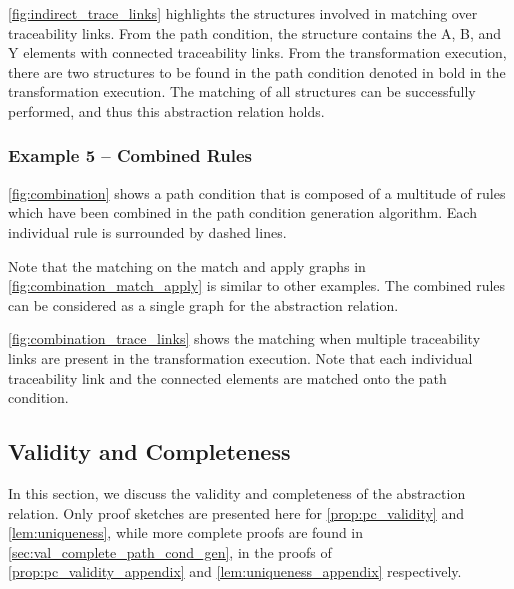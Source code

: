 \cref{fig:indirect_trace_links} highlights the structures involved in matching over traceability links. From the path condition, the structure contains the A, B, and Y elements with connected traceability links. From the transformation execution, there are two structures to be found in the path condition denoted in bold in the transformation execution. The matching of all structures can be successfully performed, and thus this abstraction relation holds.





\subsubsection{Example 5 -- Combined Rules}



\cref{fig:combination} shows a path condition that is composed of a multitude of rules which have been combined in the path condition generation algorithm. Each individual rule is surrounded by dashed lines.

Note that the matching on the match and apply graphs in \cref{fig:combination_match_apply} is similar to other examples. The combined rules can be considered as a single graph for the abstraction relation.

\cref{fig:combination_trace_links} shows the matching when multiple traceability links are present in the transformation execution. Note that each individual traceability link and the connected elements are matched onto the path condition.

\subsection{Validity and Completeness}
\label{subsec:abstraction_relation_validity_completeness}

In this section, we discuss the validity and completeness of the abstraction relation. Only proof sketches are presented here for \cref{prop:pc_validity} and \cref{lem:uniqueness}, while more complete proofs are found in \cref{sec:val_complete_path_cond_gen}, in the proofs of \cref{prop:pc_validity_appendix} and \cref{lem:uniqueness_appendix} respectively.


